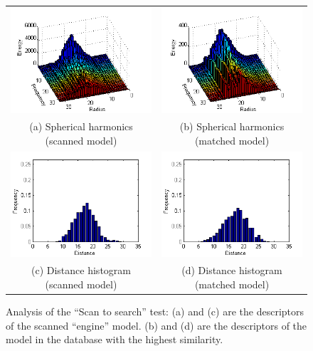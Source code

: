 \begin{figure}
\begin{center}
\begin{tabular}{cc}   %
   \includegraphics[width=0.45\linewidth]{scantosearch_test_SH_scanned} & 
   \includegraphics[width=0.45\linewidth]{scantosearch_test_SH_matched}  \\
   (a) Spherical harmonics (scanned model) & (b) Spherical harmonics (matched model)\\
   \includegraphics[width=0.45\linewidth]{scantosearch_test_DH_scanned} &
   \includegraphics[width=0.45\linewidth]{scantosearch_test_DH_matched}  \\
   (c) Distance histogram (scanned model) & (d) Distance histogram (matched model)\\
\end{tabular}
\caption{Analysis of the ``Scan to search'' test: (a) and (c) are the descriptors of the scanned ``engine'' model. (b) and (d) are the descriptors of the model in the database with the highest similarity. } 
  \label{scantosearchtest_analysis}
\end{center}
\end{figure}

